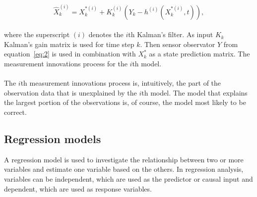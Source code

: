 \begin{equation} \label{eq:3}
\hat{X}_{k}^{(i)} = X_{k}^{*(i)} + K_k^{(i)}(Y_k - h^{(i)}(X_{k}^{*(i)},t)),
\end{equation}
\\
where the superscript $(i)$ denotes the $i$th Kalman's filter.
As input $K_k$ Kalman's gain matrix is used for time step $k$.
Then sensor observator $Y$ from equation~\ref{eq:2} is used in combination with $X_{k}^{*}$ as a state prediction matrix.
The measurement innovations process for the $i$th model.\\
\\
The $i$th measurement innovations process is, intuitively, the part of the observation data that is unexplained by the $i$th model.
The model that explains the largest portion of the observations is, of course, the model most likely to be correct.\\

\subsection{Regression models} \label{sec:regression}
A regression model is used to investigate the relationship between two or more variables and estimate one variable based on the others.
In regression analysis, variables can be independent, which are used as the predictor or causal input and dependent, which are used as response variables.


